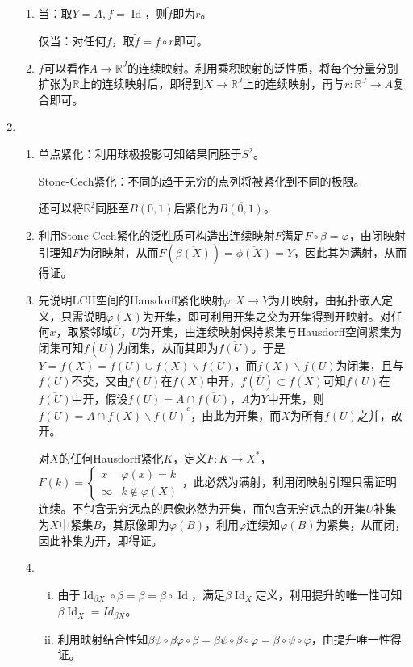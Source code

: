 \documentclass[a4paper,UTF8,fontset=windows]{ctexart}
\DeclareMathOperator{\Id}{Id}
\begin{document}
\begin{enumerate}[(1)]
\begin{enumerate}
    \item
    当：取$Y=A,f=\Id$，则$\tilde{f}$即为$r$。
    
    仅当：对任何$f$，取$\tilde{f}=f\circ r$即可。
    
    \item
    $f$可以看作$A\to\mathbb{R}^J$的连续映射。利用乘积映射的泛性质，将每个分量分别扩张为$\mathbb{R}$上的连续映射后，即得到$X\to\mathbb{R}^J$上的连续映射，再与$r:\mathbb{R}^J\to A$复合即可。
    \end{enumerate}
    
    \item
    \begin{enumerate}
    \item
    单点紧化：利用球极投影可知结果同胚于$S^2$。
    
    Stone-Cech紧化：不同的趋于无穷的点列将被紧化到不同的极限。
    
    还可以将$\mathbb{R}^2$同胚至$B(0,1)$后紧化为$\overline{B(0,1)}$。
    
    \item
    利用Stone-Cech紧化的泛性质可构造出连续映射$F$满足$F\circ\beta=\varphi$，由闭映射引理知$F$为闭映射，从而$F(\overline{\beta(X)})=\overline{\phi(X)}=Y$，因此其为满射，从而得证。
    
    \item
    先说明LCH空间的Hausdorff紧化映射$\varphi:X\to Y$为开映射，由拓扑嵌入定义，只需说明$\varphi(X)$为开集，即可利用开集之交为开集得到开映射。对任何$x$，取紧邻域$\overline{U}$，$U$为开集，由连续映射保持紧集与Hausdorff空间紧集为闭集可知$f(\overline{U})$为闭集，从而其即为$\overline{f(U)}$。于是$Y=\overline{f(X)}=\overline{f(U)}\cup\overline{f(X)\backslash f(U)}$，而$\overline{f(X)\backslash f(U)}$为闭集，且与$f(U)$不交，又由$f(U)$在$f(X)$中开，$f(\overline{U})\subset f(X)$可知$f(U)$在$\overline{f(U)}$中开，假设$f(U)=A\cap\overline{f(U)}$，$A$为$Y$中开集，则$f(U)=A\cap\overline{f(X)\backslash f(U)}^c$，由此为开集，而$X$为所有$f(U)$之并，故开。
    
    对$X$的任何Hausdorff紧化$K$，定义$F:K\to X^*$，$F(k)=\begin{cases}x&\varphi(x)=k\\\infty&k\notin\varphi(X)\end{cases}$，此必然为满射，利用闭映射引理只需证明连续。不包含无穷远点的原像必然为开集，而包含无穷远点的开集$U$补集为$X$中紧集$B$，其原像即为$\varphi(B)$，利用$\varphi$连续知$\varphi(B)$为紧集，从而闭，因此补集为开，即得证。
    
    \item
    \begin{enumerate}[(i)]
    \item
    由于$\Id_{\beta X}\circ\beta=\beta=\beta\circ\Id$，满足$\beta\Id_X$定义，利用提升的唯一性可知$\beta\Id_X=Id_{\beta X}$。
    
    \item
    利用映射结合性知$\beta\psi\circ\beta\varphi\circ\beta=\beta\psi\circ\beta\circ\varphi=\beta\circ\psi\circ\varphi$，由提升唯一性得证。
    \end{enumerate}
    \end{enumerate}
\end{enumerate}
\end{document}
